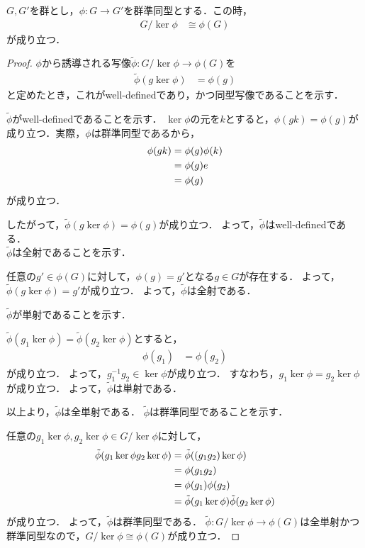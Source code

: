 \begin{theorem}\label{Fundamental theorem on homomorphisms}

$G,G'$を群とし，$\phi:G\to G'$を群準同型とする．この時，
\begin{align}
    G/\ker\phi &\cong \phi(G)
\end{align}
が成り立つ．
\end{theorem}
\begin{proof}
    $\phi$から誘導される写像$\tilde{\phi} : G/\ker\phi\to \phi(G)$を
    \begin{align}
        \tilde{\phi}(g\ker\phi) &= \phi(g)
    \end{align}
    と定めたとき，これがwell-definedであり，かつ同型写像であることを示す．

    $\tilde{\phi}$がwell-definedであることを示す．
    $\ker\phi$の元を$k$とすると，$\phi(gk)=\phi(g)$が成り立つ．実際，$\phi$は群準同型であるから，
    \begin{align}
        \phi(gk) &= \phi(g)\phi(k) \notag\\
        &= \phi(g)e \notag\\
        &= \phi(g) \notag
    \end{align}
    が成り立つ．

    したがって，$\tilde{\phi}(g\ker\phi)=\phi(g)$が成り立つ．
    よって，$\tilde{\phi}$はwell-definedである．\\

    $\tilde{\phi}$は全射であることを示す．

    任意の$g'\in \phi(G)$に対して，$\phi(g)=g'$となる$g\in G$が存在する．
    よって，$\tilde{\phi}(g\ker\phi)=g'$が成り立つ．
    よって，$\tilde{\phi}$は全射である．


    $\tilde{\phi}$が単射であることを示す．

    $\tilde{\phi}(g_1\ker\phi)=\tilde{\phi}(g_2\ker\phi)$とすると，
    \begin{align}
        \phi(g_1) &= \phi(g_2)
    \end{align}
    が成り立つ．
    よって，$g_1^{-1}g_2\in \ker\phi$が成り立つ．
    すなわち，$g_1\ker\phi=g_2\ker\phi$が成り立つ．
    よって，$\tilde{\phi}$は単射である．

    以上より，$\tilde{\phi}$は全単射である．
    $\tilde{\phi}$は群準同型であることを示す．

    任意の$g_1\ker\phi,g_2\ker\phi\in G/\ker\phi$に対して，
    \begin{align}
        \tilde{\phi}(g_1\ker\phi g_2\ker\phi) &= \tilde{\phi}((g_1g_2)\ker\phi) \notag\\
        &= \phi(g_1g_2) \notag\\
        &= \phi(g_1)\phi(g_2) \notag\\
        &= \tilde{\phi}(g_1\ker\phi)\tilde{\phi}(g_2\ker\phi) \notag
    \end{align}
    が成り立つ．
    よって，$\tilde{\phi}$は群準同型である．
    $\tilde{\phi} : G/\ker\phi\to \phi(G)$は全単射かつ群準同型なので，$G/\ker\phi \cong \phi(G)$が成り立つ．
\end{proof}



